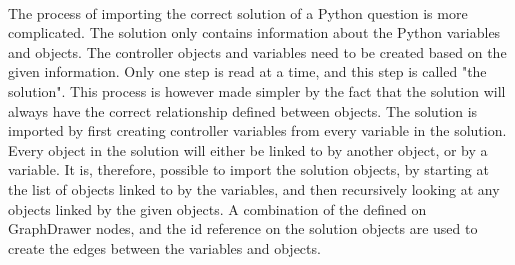 \\[11pt]
The process of importing the correct solution of a Python question is more complicated. The solution only contains information about the Python variables and objects. The controller objects and variables need to be created based on the given information. Only one step is read at a time, and this step is called "the solution". This process is however made simpler by the fact that the solution will always have the correct relationship defined between objects. The solution is imported by first creating controller variables from every variable in the solution. Every object in the solution will either be linked to by another object, or by a variable. It is, therefore, possible to import the solution objects, by starting at the list of objects linked to by the variables, and then recursively looking at any objects linked by the given objects. A combination of the  defined on GraphDrawer nodes, and the id reference on the solution objects are used to create the edges between the variables and objects.